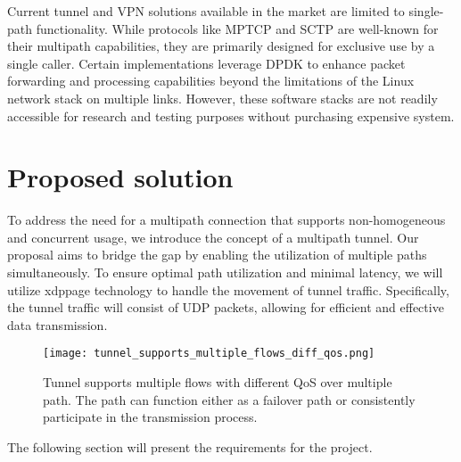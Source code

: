 Current tunnel and VPN solutions available in the market are limited to single-path functionality. While protocols like \ac{MPTCP} and \ac{SCTP} are well-known for their multipath capabilities, they are primarily designed for exclusive use by a single caller.
Certain implementations leverage DPDK to enhance packet forwarding and processing capabilities beyond the limitations of the Linux network stack on multiple links. 
However, these software stacks are not readily accessible for research and testing purposes without purchasing expensive system.

\section{Proposed solution}\label{sec:reqs:proposed_solution}
To address the need for a multipath connection that supports non-homogeneous and concurrent usage, we introduce the concept of a multipath tunnel. 
Our proposal aims to bridge the gap by enabling the utilization of multiple paths simultaneously.
To ensure optimal path utilization and minimal latency, we will utilize \ac{xdppage} technology to handle the movement of tunnel traffic. 
Specifically, the tunnel traffic will consist of UDP packets, allowing for efficient and effective data transmission.

\begin{figure}[H]
	\centering
	\texttt{[image: tunnel\_supports\_multiple\_flows\_diff\_qos.png]}
	\caption{Tunnel supports multiple flows with different QoS over multiple path. The path can function either as a failover path or consistently participate in the transmission process.}\label{fig:reqs:tunnel_supports_multiple_flows_diff_qos}
\end{figure}

The following section will present the requirements for the project. 

